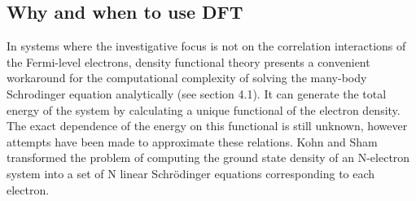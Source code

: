 \documentclass[10pt]{article}
\begin{document}










\subsection{Why and when to use DFT}
In systems where the investigative focus is not on the correlation interactions of the Fermi-level electrons, density functional theory presents a convenient workaround for the computational complexity of solving the many-body Schrodinger equation analytically (see section 4.1). It can generate the total energy of the system by calculating a unique functional of the electron density. The exact dependence of the energy on this functional is still unknown, however attempts have been made to approximate these relations. Kohn and Sham transformed the problem of computing the ground state density of an N-electron system into a set of N linear Schrödinger equations corresponding to each electron. 
\end{document}
